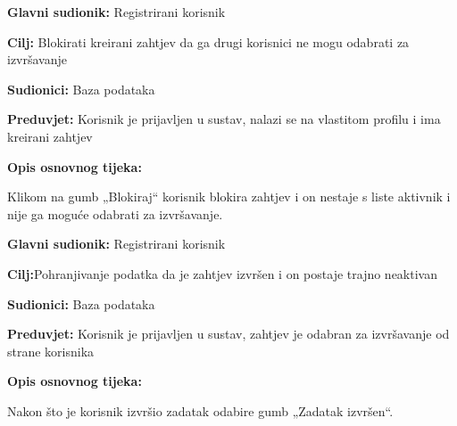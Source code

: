 \noindent {}
\begin{packed_item}
	\item \textbf{Glavni sudionik: }Registrirani korisnik
	\item  \textbf{Cilj:} Blokirati kreirani zahtjev da ga drugi korisnici ne mogu odabrati za izvršavanje
	\item  \textbf{Sudionici:} Baza podataka
	\item  \textbf{Preduvjet:} Korisnik je prijavljen u sustav, nalazi se na vlastitom profilu i ima kreirani zahtjev
	\item  \textbf{Opis osnovnog tijeka:}
	
	\item[] \begin{packed_enum}
		
		\item 	Klikom na gumb „Blokiraj“ korisnik blokira zahtjev i on nestaje s liste aktivnik i nije ga moguće odabrati za izvršavanje. 
	\end{packed_enum}
	
\end{packed_item}

\noindent {}
\begin{packed_item}
	\item \textbf{Glavni sudionik: }Registrirani korisnik
	\item  \textbf{Cilj:}Pohranjivanje podatka da je zahtjev izvršen i on postaje trajno neaktivan
	\item  \textbf{Sudionici:} Baza podataka
	\item  \textbf{Preduvjet:} Korisnik je prijavljen u sustav, zahtjev je odabran za izvršavanje od strane korisnika
	\item  \textbf{Opis osnovnog tijeka:}
	
	\item[] \begin{packed_enum}
		
		\item 	Nakon što je korisnik izvršio zadatak odabire gumb „Zadatak izvršen“. 
	\end{packed_enum}
	
\end{packed_item}

